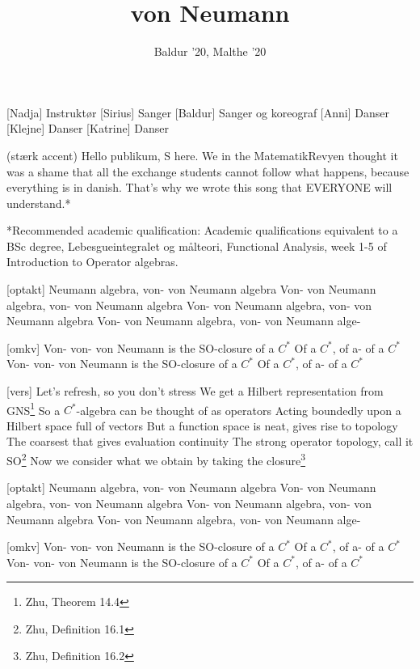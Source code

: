 \documentclass[a4paper,11pt]{article}
\title{von Neumann}
\author{Baldur '20, Malthe '20}
\begin{document}
\maketitle

\begin{roles}
[Nadja] Instruktør
[Sirius] Sanger
[Baldur] Sanger og koreograf
[Anni] Danser
[Klejne] Danser
[Katrine] Danser
\end{roles}

\begin{song}
  (stærk accent) Hello publikum, S here. We in the MatematikRevyen thought it was a shame that all the exchange students cannot follow what happens, because everything is in danish. That's why we wrote this song that EVERYONE will understand.*

 *Recommended academic qualification: Academic qualifications equivalent to a BSc degree, Lebesgueintegralet og målteori, Functional Analysis, week 1-5 of Introduction to Operator algebras.

  [optakt] Neumann algebra, von- von Neumann algebra
  Von- von Neumann algebra, von- von Neumann algebra
  Von- von Neumann algebra, von- von Neumann algebra
  Von- von Neumann algebra, von- von Neumann alge-

[omkv] Von- von- von Neumann is the SO-closure of a $C^\ast$
Of a $C^\ast$, of a- of a $C^\ast$
Von- von- von Neumann is the SO-closure of a $C^\ast$
Of a $C^\ast$, of a- of a $C^\ast$

[vers] Let’s refresh, so you don’t stress
We get a Hilbert representation from GNS\footnote{Zhu, Theorem 14.4}
So a $C^\ast$-algebra can be thought of as operators
Acting boundedly upon a Hilbert space full of vectors
But a function space is neat, gives rise to topology
The coarsest that gives evaluation continuity
The strong operator topology, call it SO\footnote{Zhu, Definition 16.1}
Now we consider what we obtain by taking the closure\footnote{Zhu, Definition 16.2}

[optakt] Neumann algebra, von- von Neumann algebra
  Von- von Neumann algebra, von- von Neumann algebra
  Von- von Neumann algebra, von- von Neumann algebra
  Von- von Neumann algebra, von- von Neumann alge-

[omkv] Von- von- von Neumann is the SO-closure of a $C^\ast$
Of a $C^\ast$, of a- of a $C^\ast$
Von- von- von Neumann is the SO-closure of a $C^\ast$
Of a $C^\ast$, of a- of a $C^\ast$


\end{song}
\end{document}
